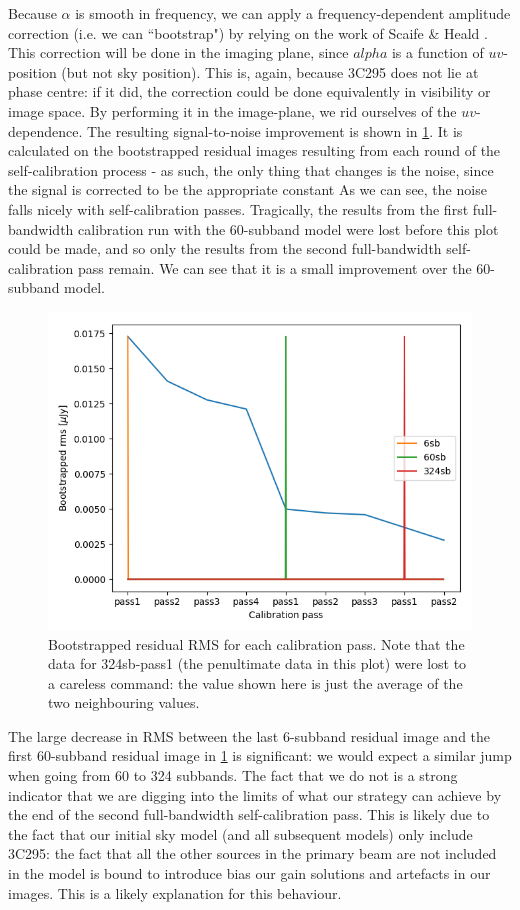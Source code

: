 \pg
Because $\alpha$ is smooth in frequency, we can apply a frequency-dependent amplitude correction (i.e. we can ``bootstrap") by relying on the work of Scaife \& Heald \citep[see][]{arse}. This correction will be done in the imaging plane, since $alpha$ is a function of $uv$-position (but not sky position). This is, again, because 3C295 does not lie at phase centre: if it did, the correction could be done equivalently in visibility or image space. By performing it in the image-plane, we rid ourselves of the $uv$-dependence. The resulting signal-to-noise improvement is shown in \cref{fig.SCrms}. It is calculated on the bootstrapped residual images resulting from each round of the self-calibration process - as such, the only thing that changes is the noise, since the signal is corrected to be the appropriate constant As we can see, the noise falls nicely with self-calibration passes. Tragically, the results from the first full-bandwidth calibration run with the 60-subband model were lost before this plot could be made, and so only the results from the second full-bandwidth self-calibration pass remain. We can see that it is a small improvement over the 60-subband model. 
\begin{figure}[h]
\includegraphics[width=0.8\linewidth]{images/SCrms.png}
\caption{\label{fig.SCrms} Bootstrapped residual RMS for each calibration pass. Note that the data for 324sb-pass1 (the penultimate data in this plot) were lost to a careless command: the value shown here is just the average of the two neighbouring values.}
\end{figure}

\pg
The large decrease in RMS between the last 6-subband residual image and the first 60-subband residual image in \cref{fig.SCrms} is significant: we would expect a similar jump when going from 60 to 324 subbands. The fact that we do not is a strong indicator that we are digging into the limits of what our strategy can achieve by the end of the second full-bandwidth self-calibration pass. This is likely due to the fact that our initial sky model (and all subsequent models) only include 3C295: the fact that all the other sources in the primary beam are not included in the model is bound to introduce bias our gain solutions and artefacts in our images. This is a likely explanation for this behaviour.


